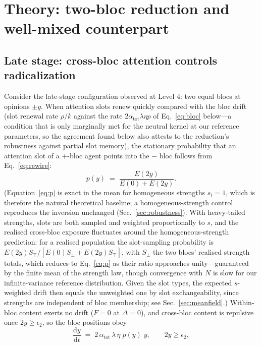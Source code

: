 \documentclass[5p,times,twocolumn]{elsarticle}
\newcommand{\dd}{\mathrm{d}}
\begin{document}
\section{Theory: two-bloc reduction and well-mixed counterpart}
\label{sec:theory}

\subsection{Late stage: cross-bloc attention controls radicalization}
\label{sec:twobloc}

Consider the late-stage configuration observed at Level 4: two equal blocs
at opinions $\pm y$. When attention slots renew quickly compared with the
bloc drift (slot renewal rate $\rho/k$ against the rate
$2\alpha_{\mathrm{tot}}\lambda\eta p$ of Eq.~\eqref{eq:bloc} below---a
condition that is only marginally met for the neutral kernel at our
reference parameters, so the agreement found below also attests to the
reduction's robustness against partial slot memory), the stationary
probability that an attention slot of a $+$-bloc agent
points into the $-$ bloc follows from Eq.~\eqref{eq:rewire}:
\begin{equation}
  p(y) \;=\; \frac{E(2y)}{E(0) + E(2y)}.
  \label{eq:p}
\end{equation}
(Equation~\eqref{eq:p} is exact in the mean for homogeneous strengths
$s_i = 1$, which is therefore the natural theoretical baseline; a
homogeneous-strength control reproduces the inversion unchanged
(Sec.~\ref{sec:robustness}). With heavy-tailed strengths, slots are both
sampled and weighted proportionally to $s$, and the realised cross-bloc
exposure fluctuates around the homogeneous-strength prediction: for a
realised population the slot-sampling probability is
$E(2y) S_{\mp} / [E(0) S_{\pm} + E(2y) S_{\mp}]$, with $S_{\pm}$ the two
blocs' realised strength totals, which reduces to Eq.~\eqref{eq:p} as
their ratio approaches unity---guaranteed by the finite mean of the
strength law, though convergence with $N$ is slow for our
infinite-variance reference distribution. Given the slot types, the
expected $s$-weighted drift then equals the unweighted one by slot
exchangeability, since strengths are independent of bloc membership; see
Sec.~\ref{sec:meanfield}.) Within-bloc content
exerts no drift ($F = 0$ at $\Delta = 0$), and
cross-bloc content is repulsive once $2y \ge \epsilon_2$, so the bloc
positions obey
\begin{equation}
  \frac{\dd y}{\dd t} \;=\; 2\,\alpha_{\mathrm{tot}}\,\lambda\,\eta\;
  p(y)\; y,
  \qquad 2y \ge \epsilon_2,
  \label{eq:bloc}
\end{equation}
\end{document}
